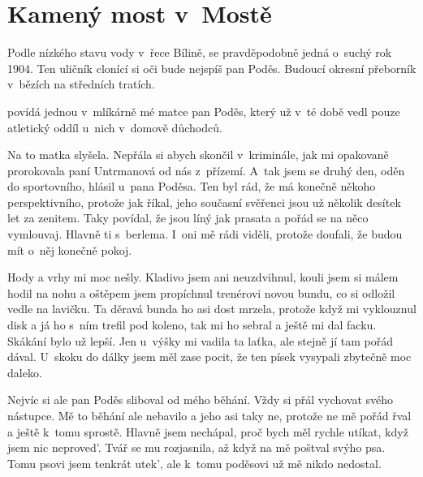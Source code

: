 
\chapter{Kamený most v~Mostě}

Podle nízkého stavu vody v~řece Bílině, se
pravděpodobně jedná o~suchý rok 1904. Ten uličník clonící si oči bude
nejspíš pan Poděs. Budoucí okresní přeborník v~bězích na středních
tratích.

 povídá
jednou v~mlíkárně mé matce pan Poděs, který už v~té době vedl pouze
atletický oddíl u~nich v~domově důchodců.


Na to matka slyšela. Nepřála si abych skončil v~kriminále, jak mi opakovaně
prorokovala paní Untrmanová od nás z~přízemí. A~tak jsem se druhý den, oděn do
sportovního, hlásil u~pana Poděsa. Ten byl rád, že má konečně někoho
perspektivního, protože jak říkal, jeho současní svěřenci jsou už několik
desítek let za zenitem. Taky povídal, že jsou líný jak prasata a pořád se na
něco vymlouvaj. Hlavně ti s~berlema. I~oni mě rádi viděli, protože doufali, že
budou mít o~něj konečně pokoj.

Hody a vrhy mi moc nešly. Kladivo jsem ani neuzdvihnul, kouli jsem si málem
hodil na nohu a oštěpem jsem propíchnul trenérovi novou bundu, co si odložil
vedle na lavičku. Ta děravá bunda ho asi dost mrzela, protože když mi
vyklouznul disk a já ho s~ním trefil pod koleno, tak mi ho sebral a ještě mi
dal facku. Skákání bylo už lepší. Jen u~výšky mi vadila ta laťka, ale stejně jí
tam pořád dával. U~skoku do dálky jsem měl zase pocit, že ten písek vysypali
zbytečně moc daleko.

Nejvíc si ale pan Poděs sliboval od mého běhání. Vždy si přál vychovat svého
nástupce. Mě to běhání ale nebavilo a jeho asi taky ne, protože ne mě pořád
řval a ještě k~tomu sprostě. Hlavně jsem nechápal, proč bych měl rychle utíkat,
když jsem nic neproved'. Tvář se mu rozjasnila, až když na mě poštval svýho psa.
Tomu psovi jsem tenkrát utek', ale k~tomu poděsovi už mě nikdo nedostal.

